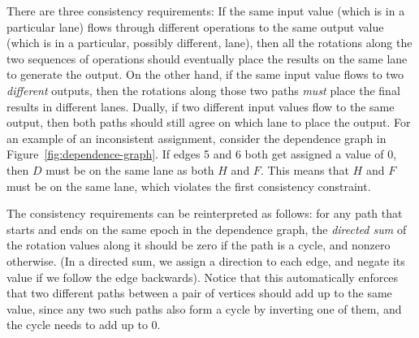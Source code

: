 There are three consistency requirements: If the same input value (which is in a particular lane) flows through different operations to the same output value (which is in a particular, possibly different, lane), then all the rotations along the two sequences of operations should eventually place the results on the same lane to generate the output. 
On the other hand, if the same input value flows to two {\em different} outputs, then the rotations along those two paths {\em must} place the final results in different lanes. %
Dually, if two different input values flow to the same output, then both paths should still agree on which lane to place the output.
For an example of an inconsistent assignment, consider the dependence graph in Figure~\ref{fig:dependence-graph}.
If edges 5 and 6 both get assigned a value of 0, then $D$ must be on the same lane as both $H$ and $F$.
This means that $H$ and $F$ must be on the same lane, which violates the first consistency constraint.

The consistency requirements can be reinterpreted as follows: for any path that starts and ends on the same epoch in the dependence graph, the {\em directed sum} of the rotation values along it should be zero if the path is a cycle, and nonzero otherwise.
(In a directed sum, we assign a direction to each edge, and negate its value if we follow the edge backwards).
Notice that this automatically enforces that two different paths between a pair of vertices should add up to the same value, since any two such paths also form a cycle by inverting one of them, and the cycle needs to add up to 0. 

